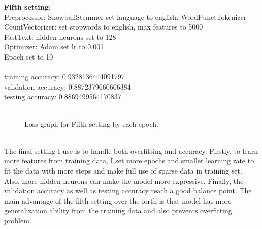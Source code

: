 \documentclass{article} %
\begin{document}
\noindent
\textbf{Fifth setting}:\\
Preprocessor: SnowballStemmer set language to english, WordPunctTokenizer\\
CountVectorizer: set stopwords to english, max features to 5000\\
FastText: hidden neurons set to 128\\
Optimizer: Adam set lr to 0.001\\
Epoch set to 10\\
\\
\noindent
training accuracy: 0.9328136444091797\\
validation accuracy: 0.8872379660606384\\
testing accuracy: 0.8869499564170837\\
\begin{figure}[htp]
    \centering
    \\
Loss graph for Fifth setting by each epoch.   
    \end{figure}
    \\
The final setting I use is to handle both overfitting and accuracy. Firstly, to learn more features from training data, I set more epochs and smaller learning rate to fit the data with more steps and make full use of sparse data in training set. Also, more hidden neurons can make the model more expressive. Finally, the validation accuracy as well as testing accuracy reach a good balance point. The main advantage of the fifth setting over the forth is that model has more generalization ability from the training data and also prevents overfitting problem.
\end{document}
